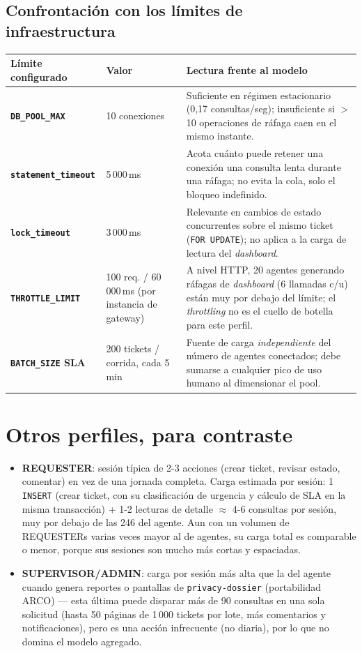 \documentclass[11pt,a4paper]{article}
\begin{document}
\subsection{Confrontación con los límites de infraestructura}

\begin{longtable}{@{}>{\bfseries}p{4.3cm} p{3.6cm} L{4.8cm}@{}}
\toprule
\textbf{Límite configurado} & \textbf{Valor} & \textbf{Lectura frente al modelo} \\
\midrule
\endhead
\texttt{DB\_POOL\_MAX} & 10 conexiones & Suficiente en régimen estacionario (0{,}17 consultas/seg); insuficiente si $>$10 operaciones de ráfaga caen en el mismo instante. \\
\texttt{statement\_timeout} & 5\,000\,ms & Acota cuánto puede retener una conexión una consulta lenta durante una ráfaga; no evita la cola, solo el bloqueo indefinido. \\
\texttt{lock\_timeout} & 3\,000\,ms & Relevante en cambios de estado concurrentes sobre el mismo ticket (\texttt{FOR UPDATE}); no aplica a la carga de lectura del \emph{dashboard}. \\
\texttt{THROTTLE\_LIMIT} & 100 req. / 60\,000\,ms (por instancia de gateway) & A nivel HTTP, 20 agentes generando ráfagas de \emph{dashboard} (6 llamadas c/u) están muy por debajo del límite; el \emph{throttling} no es el cuello de botella para este perfil. \\
\texttt{BATCH\_SIZE} SLA & 200 tickets / corrida, cada 5 min & Fuente de carga \emph{independiente} del número de agentes conectados; debe sumarse a cualquier pico de uso humano al dimensionar el pool. \\
\bottomrule
\end{longtable}

\section{Otros perfiles, para contraste}
\label{sec:otros-perfiles}

\begin{itemize}[leftmargin=1.2cm]
  \item \textbf{REQUESTER}: sesión típica de 2-3 acciones (crear ticket,
    revisar estado, comentar) en vez de una jornada completa. Carga
    estimada por sesión: 1 \texttt{INSERT} (crear ticket, con su
    clasificación de urgencia y cálculo de SLA en la misma transacción) +
    1-2 lecturas de detalle $\approx$ 4-6 consultas por sesión, muy por
    debajo de las 246 del agente. Aun con un volumen de REQUESTERs varias
    veces mayor al de agentes, su carga total es comparable o menor,
    porque sus sesiones son mucho más cortas y espaciadas.
  \item \textbf{SUPERVISOR/ADMIN}: carga por sesión más alta que la del
    agente cuando genera reportes o pantallas de \texttt{privacy-dossier}
    (portabilidad ARCO) — esta última puede disparar más de 90 consultas
    en una sola solicitud (hasta 50 páginas de 1\,000 tickets por lote,
    más comentarios y notificaciones), pero es una acción infrecuente
    (no diaria), por lo que no domina el modelo agregado.
\end{itemize}
\end{document}
